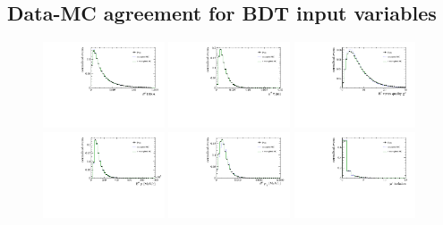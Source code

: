 \subsection{Data-MC agreement for BDT input variables}
\label{sec:appendix:data-mc-bdtvars}
 
\begin{figure}[!htb]
 \centering
 \includegraphics[width=0.32\textwidth]{figs/kpimm/data-mc/bdt/B0_DiraAngle.pdf}
 \includegraphics[width=0.32\textwidth]{figs/kpimm/data-mc/bdt/B0_TAU.pdf}
 \includegraphics[width=0.32\textwidth]{figs/kpimm/data-mc/bdt/B0_ENDVERTEX_CHI2.pdf}
 \includegraphics[width=0.32\textwidth]{figs/kpimm/data-mc/bdt/B0_P.pdf}
 \includegraphics[width=0.32\textwidth]{figs/kpimm/data-mc/bdt/B0_PT.pdf}
 \includegraphics[width=0.32\textwidth]{figs/kpimm/data-mc/bdt/Muplus_isolation_V2_15.pdf}

\end{figure}
